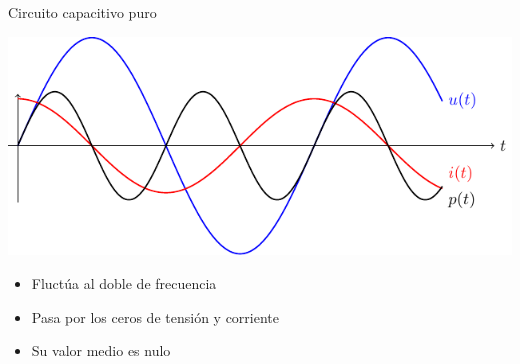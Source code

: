 \documentclass[aspectratio=169, xcolor={usenames,svgnames,dvipsnames}]{beamer}
\begin{document}
\begin{frame}{Circuito capacitivo puro}
\begin{center}
\includegraphics[width=.9\linewidth]{../figs/capacitivoPuroPotencia.pdf}
\end{center}

\begin{itemize}
\item Fluctúa al doble de frecuencia
\item Pasa por los ceros de tensión y corriente
\item Su valor medio es nulo
\end{itemize}
\end{frame}







\end{document}
